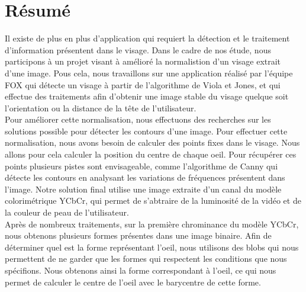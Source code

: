 \section*{Résumé}

Il existe de plus en plus d'application qui requiert la détection et le traitement d'information
présentent dans le visage. Dans le cadre de nos étude, nous participons à un projet visant
à amélioré la normalistion d'un visage extrait d'une image. Pous cela, nous travaillons
sur une application réalisé par l'équipe FOX qui détecte un visage à partir de l'algorithme de
Viola et Jones, et qui effectue des traitements afin d'obtenir une image stable du visage
quelque soit l'orientation ou la distance de la tête de l'utilisateur.\\

Pour améliorer cette normalisation, nous effectuons des recherches sur les solutions possible
pour détecter les contours d'une image. Pour effectuer cette normalisation, nous avons besoin
de calculer des points fixes dans le visage. Nous allons pour cela calculer la position du
centre de chaque oeil. Pour récupérer ces points plusieurs pistes sont envisageable, comme l'algorithme de
Canny qui détecte les contours en analysant les variations de fréquences présentent dans l'image.
Notre solution final utilise une image extraite d'un canal du modèle colorimétrique YCbCr, qui permet
de s'abtraire de la luminosité de la vidéo et de la couleur de peau de l'utilisateur.\\

Après de nombreux traitements, sur la première chrominance du modèle YCbCr, nous obtenons plusieurs
formes présentes dans une image binaire. Afin de déterminer quel est la forme représentant l'oeil,
nous utilisons des blobs qui nous permettent de ne garder que les formes qui respectent les 
conditions que nous spécifions. Nous obtenons ainsi la forme correspondant à l'oeil, ce qui nous permet 
de calculer le centre de l'oeil avec le barycentre de cette forme.


\newpage